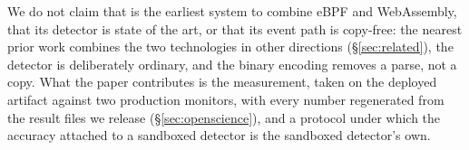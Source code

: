 We do not claim that \sys is the earliest system to combine eBPF and
WebAssembly, that its detector is state of the art, or that its event
path is copy-free: the nearest prior work combines the two technologies
in other directions (\S\ref{sec:related}), the detector is deliberately
ordinary, and the binary encoding removes a parse, not a copy. What the
paper contributes is the measurement, taken on the deployed artifact
against two production monitors, with every number regenerated from the
result files we release (\S\ref{sec:openscience}), and a protocol under
which the accuracy attached to a sandboxed detector is the sandboxed
detector's own.
